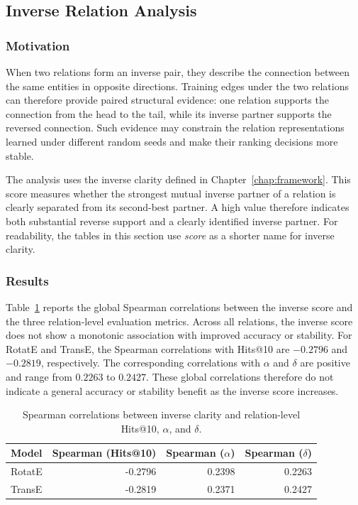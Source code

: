 \subsection{Inverse Relation Analysis}
\label{sec:inverse_analysis}

\subsubsection{Motivation}

When two relations form an inverse pair, they describe the connection between
the same entities in opposite directions. Training edges under the two
relations can therefore provide paired structural evidence: one relation
supports the connection from the head to the tail, while its inverse partner
supports the reversed connection. Such evidence may constrain the relation
representations learned under different random seeds and make their ranking
decisions more stable.

The analysis uses the inverse clarity defined in
Chapter~\ref{chap:framework}. This score measures whether the strongest mutual
inverse partner of a relation is clearly separated from its second-best
partner. A high value therefore indicates both substantial reverse support and
a clearly identified inverse partner. For readability, the tables in this
section use \emph{score} as a shorter name for inverse clarity.

\subsubsection{Results}

Table~\ref{tab:inverse-spearman} reports the global Spearman correlations
between the inverse score and the three relation-level evaluation metrics.
Across all relations, the inverse score does not show a monotonic association
with improved accuracy or stability. For RotatE and TransE, the Spearman
correlations with Hits@10 are \(-0.2796\) and \(-0.2819\), respectively. The
corresponding correlations with \(\alpha\) and \(\delta\) are positive and
range from \(0.2263\) to \(0.2427\). These global correlations therefore do
not indicate a general accuracy or stability benefit as the inverse score
increases.

\begin{table}[!t]
    \centering
    \caption{Spearman correlations between inverse clarity and relation-level
    Hits@10, \(\alpha\), and \(\delta\).}
    \label{tab:inverse-spearman}
    \small
    \begin{tabular}{lrrr}
        \toprule
        Model & Spearman (Hits@10) & Spearman (\(\alpha\)) &
        Spearman (\(\delta\)) \\
        \midrule
        RotatE & -0.2796 & 0.2398 & 0.2263 \\
        TransE & -0.2819 & 0.2371 & 0.2427 \\
        \bottomrule
    \end{tabular}
\end{table}

